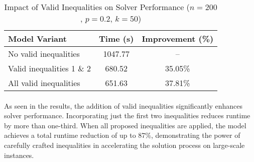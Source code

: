 \begin{table}[H]
\centering
\caption{Impact of Valid Inequalities on Solver Performance ($n=200$, $p=0.2$, $k=50$)}
\label{tab:performance2}
\begin{tabular}{l|c|c}
\textbf{Model Variant} & \textbf{Time (s)} & \textbf{Improvement (\%)} \\
\hline
No valid inequalities        & 1047.77 & -- \\
Valid inequalities 1 \& 2    & 680.52 & 35.05\% \\
All valid inequalities       & 651.63 & 37.81\% \\
\end{tabular}
\end{table}

\paragraph{} As seen in the results, the addition of valid inequalities significantly enhances solver performance. Incorporating just the first two inequalities reduces runtime by more than one-third. When all proposed inequalities are applied, the model achieves a total runtime reduction of up to 87\%, demonstrating the power of carefully crafted inequalities in accelerating the solution process on large-scale instances.
